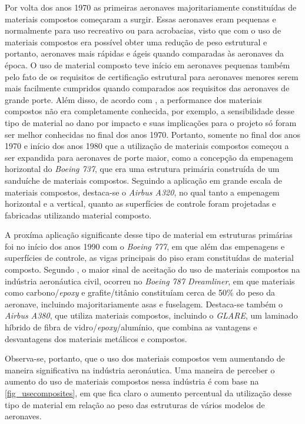 Por volta dos anos 1970 as primeiras aeronaves majoritariamente constituídas de materiais compostos começaram a surgir. Essas aeronaves eram pequenas e normalmente para uso recreativo ou para acrobacias, visto que com o uso de materiais compostos era possível obter uma redução de peso estrutural e portanto, aeronaves mais rápidas e ágeis quando comparadas às aeronaves da época. O uso de material composto teve início em aeronaves pequenas também pelo fato de os requisitos de certificação estrutural para aeronaves menores serem mais facilmente cumpridos quando comparados aos requisitos das aeronaves de grande porte. Além disso, de acordo com \cite{kassapoglou2013design}, a performance dos materiais compostos não era completamente conhecida, por exemplo, a sensibilidade desse tipo de material ao dano por impacto e suas implicações para o projeto só foram ser melhor conhecidas no final dos anos 1970. Portanto, somente no final dos anos 1970 e início dos anos 1980 que a utilização de materiais compostos começou a ser expandida para aeronaves de porte maior, como a concepção da empenagem horizontal do \emph{Boeing 737}, que era uma estrutura primária construída de um sanduíche de materiais compostos. Seguindo a aplicação em grande escala de materiais compostos, destaca-se o \emph{Airbus A320}, no qual tanto a empenagem horizontal e a vertical, quanto as superfícies de controle foram projetadas e fabricadas utilizando material composto.

A proxíma aplicação significante desse tipo de material em estruturas primárias foi no início dos anos 1990 com o \emph{Boeing 777}, em que além das empenagens e superfícies de controle, as vigas principais do piso eram constituídas de material composto.
Segundo \cite{daniel2006engineering}, o maior sinal de aceitação do uso de materiais compostos na indústria aeronáutica civil, ocorreu no \emph{Boeing 787 Dreamliner}, em que materiais como carbono/\emph{epoxy} e grafite/titânio constituíam cerca de 50\% do peso da aeronave, incluindo majoritariamente asas e fuselagem. Destaca-se também o \emph{Airbus A380}, que utiliza materiais compostos, incluindo o \emph{GLARE}, um laminado híbrido de fibra de vidro/\emph{epoxy}/alumínio, que combina as vantagens e desvantagens dos materiais metálicos e compostos.

Observa-se, portanto, que o uso dos materiais compostos vem aumentando de maneira significativa na indústria aeronáutica. Uma maneira de perceber o aumento do uso de materiais compostos nessa indústria é com base na \autoref{fig_usecomposites}, em que fica claro o aumento percentual da utilização desse tipo de material em relação ao peso das estruturas de vários modelos de aeronaves.

